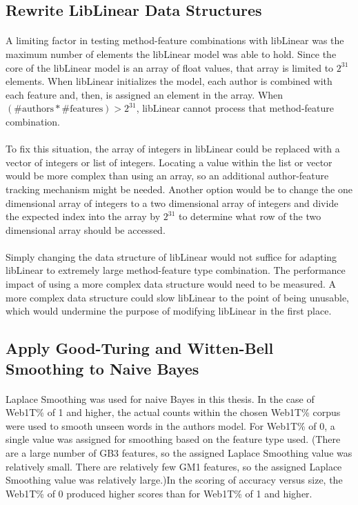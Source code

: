 	\subsection{Rewrite LibLinear Data Structures}
		\paragraph*{} A limiting factor in testing method-feature combinations with libLinear was the maximum number of elements the libLinear model was able to hold.  Since the core of the libLinear model is an array of float values, that array is limited to $2^{31}$ elements.  When libLinear initializes the model, each author is combined with each feature and, then, is assigned an element in the array.  When $ (\text{\# authors} * \text{\# features}) > 2^{31}$, libLinear cannot process that method-feature combination.
		\paragraph*{} To fix this situation, the array of integers in libLinear could be replaced with a vector of integers or list of integers.  Locating a value within the list or vector would be more complex than using an array, so an additional author-feature tracking mechanism might be needed.  Another option would be to change the one dimensional array of integers to a two dimensional array of integers and divide the expected index into the array by $2^{31}$ to determine what row of the two dimensional array should be accessed.
		\paragraph*{} Simply changing the data structure of libLinear would not suffice for adapting libLinear to extremely large method-feature type combination.  The performance impact of using a more complex data structure would need to be measured.  A more complex data structure could slow libLinear to the point of being unusable, which would undermine the purpose of modifying libLinear in the first place.

	\subsection{Apply Good-Turing and Witten-Bell Smoothing to Naive Bayes}
		\paragraph*{} Laplace Smoothing was used for naive Bayes in this thesis. In the case of Web1T\% of 1 and higher, the actual counts within the chosen Web1T\% corpus were used to smooth unseen words in the authors model.   For Web1T\% of 0, a single value was assigned for smoothing based on the feature type used. (There are a large number of GB3 features, so the assigned Laplace Smoothing value was relatively small.  There are relatively few GM1 features, so the assigned Laplace Smoothing value was relatively large.)In the scoring of accuracy versus size, the Web1T\% of 0 produced higher scores than for Web1T\% of 1 and higher.
